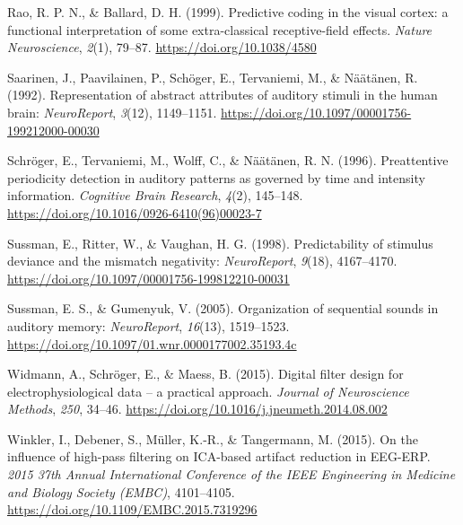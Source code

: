 \documentclass[stu,a4paper,11pt,floatsintext]{apa7}
\newenvironment{cslreferences}%
  {\setlength{\parindent}{0pt}%
  \everypar{\setlength{\hangindent}{\cslhangindent}}\ignorespaces}%
  {\par}
\newlength{\cslhangindent}
\begin{document}
\begin{cslreferences}
\leavevmode\hypertarget{ref-raoPredictiveCodingVisual1999}{}%
Rao, R. P. N., \& Ballard, D. H. (1999). Predictive coding in the visual
cortex: a functional interpretation of some extra-classical
receptive-field effects. \emph{Nature Neuroscience}, \emph{2}(1),
79--87. \url{https://doi.org/10.1038/4580}

\leavevmode\hypertarget{ref-saarinenRepresentationAbstractAttributes1992}{}%
Saarinen, J., Paavilainen, P., Schöger, E., Tervaniemi, M., \& Näätänen,
R. (1992). Representation of abstract attributes of auditory stimuli in
the human brain: \emph{NeuroReport}, \emph{3}(12), 1149--1151.
\url{https://doi.org/10.1097/00001756-199212000-00030}

\leavevmode\hypertarget{ref-schrogerPreattentivePeriodicityDetection1996}{}%
Schröger, E., Tervaniemi, M., Wolff, C., \& Näätänen, R. N. (1996).
Preattentive periodicity detection in auditory patterns as governed by
time and intensity information. \emph{Cognitive Brain Research},
\emph{4}(2), 145--148.
\url{https://doi.org/10.1016/0926-6410(96)00023-7}

\leavevmode\hypertarget{ref-sussmanPredictabilityStimulusDeviance1998}{}%
Sussman, E., Ritter, W., \& Vaughan, H. G. (1998). Predictability of
stimulus deviance and the mismatch negativity: \emph{NeuroReport},
\emph{9}(18), 4167--4170.
\url{https://doi.org/10.1097/00001756-199812210-00031}

\leavevmode\hypertarget{ref-sussmanOrganizationSequentialSounds2005}{}%
Sussman, E. S., \& Gumenyuk, V. (2005). Organization of sequential
sounds in auditory memory: \emph{NeuroReport}, \emph{16}(13),
1519--1523. \url{https://doi.org/10.1097/01.wnr.0000177002.35193.4c}

\leavevmode\hypertarget{ref-widmannDigitalFilterDesign2015}{}%
Widmann, A., Schröger, E., \& Maess, B. (2015). Digital filter design
for electrophysiological data -- a practical approach. \emph{Journal of
Neuroscience Methods}, \emph{250}, 34--46.
\url{https://doi.org/10.1016/j.jneumeth.2014.08.002}

\leavevmode\hypertarget{ref-winklerInfluenceHighpassFiltering2015}{}%
Winkler, I., Debener, S., Müller, K.-R., \& Tangermann, M. (2015). On
the influence of high-pass filtering on ICA-based artifact reduction in
EEG-ERP. \emph{2015 37th Annual International Conference of the IEEE
Engineering in Medicine and Biology Society (EMBC)}, 4101--4105.
\url{https://doi.org/10.1109/EMBC.2015.7319296}
\end{cslreferences}
\end{document}
